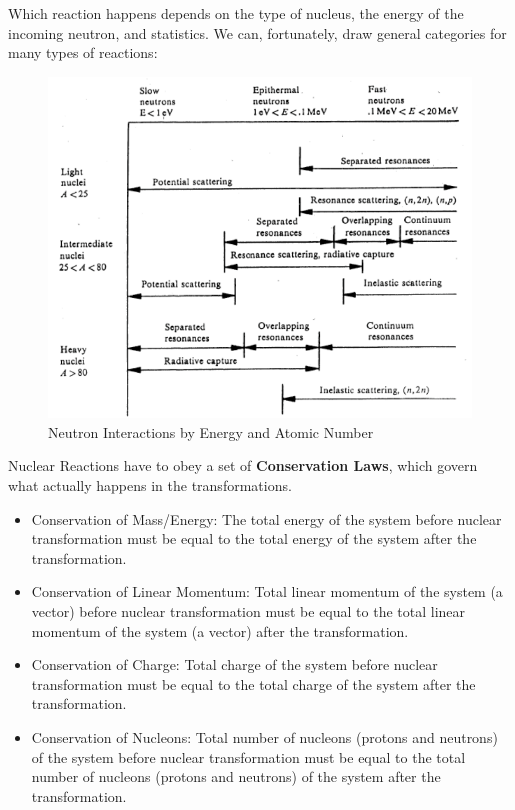 \documentclass[12pt]{article}
\begin{document}
Which reaction happens depends on the type of nucleus, the energy of the incoming neutron, and statistics. We can, fortunately, draw general categories for many types of reactions:

\begin{figure}[h!]
    \begin{center}
    \includegraphics[keepaspectratio, width = 5 in]{../figs/reactionenergy}
    \caption{Neutron Interactions by Energy and Atomic Number}
    \label{fig:phase_space}
    \end{center}
\end{figure}

Nuclear Reactions have to obey a set of \textbf{Conservation Laws}, which govern what actually happens in the transformations. 

\begin{itemize}
\item Conservation of Mass/Energy: The total energy of the system before nuclear transformation must be equal to the total energy of the system after the transformation.

\item Conservation of Linear Momentum: Total linear momentum of the system (a vector) before nuclear transformation must be equal to the total linear momentum of the system (a vector) after the transformation.

\item Conservation of Charge: Total charge of the system before nuclear
transformation must be equal to the total charge of the system after the transformation.

\item Conservation of Nucleons: Total number of nucleons (protons and neutrons) of the system before nuclear transformation must be equal to the total number of nucleons (protons and neutrons) of the system after the transformation.
\end{itemize}
\end{document}
